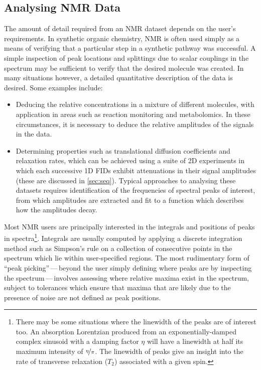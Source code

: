 \subsection{Analysing NMR Data}
\label{subsec:estimation-techniques}
The amount of detail required from an \ac{NMR} dataset depends on
the user's requirements. In synthetic organic chemistry, \ac{NMR} is often used
simply as a means of verifying that a particular step in a synthetic pathway
was successful. A simple inspection of peak locations and splittings due to
scalar couplings in the spectrum may be sufficient to verify that the desired
molecule was created. In many situations however, a detailed quantitative
description of the data is desired. Some examples include:
\begin{itemize}
    \item Deducing the relative concentrations in a mixture of different
        molecules, with application in areas such as reaction
        monitoring\cite{Bernstein2016} and metabolomics\cite{Emwas2019}.
        In these circumstances, it is necessary to deduce the relative
        amplitudes of the signals in the data.
    \item Determining properties such as translational diffusion coefficients
        and relaxation rates, which can be achieved using a suite of \ac{2D}
        experiments in which each successive \ac{1D} \acp{FID} exhibit
        attenuations in their signal amplitudes (these are discussed in
        \cref{sec:seq}).  Typical approaches to analysing these datasets
        requires identification of the frequencies of spectral peaks of
        interest, from which amplitudes are extracted and fit to a
        function which describes how the amplitudes decay.
\end{itemize}

Most \ac{NMR} users are principally interested in the integrals and positions
of peaks in spectra\footnote{
    There may be some situations where the linewidth of the peaks are of
    interest too. An absorption Lorentzian produced from an
    exponentially-damped complex sinusoid with a damping factor $\eta$ will
    have a linewidth at half its maximum intensity of $\nicefrac{\eta}{\pi}$.
    The linewidth of peaks give an insight into the rate of transverse
    relaxation ($T_2$) associated with a given spin.
}.
Integrals are usually computed by applying a discrete integration method such
as Simpson's rule on a collection of consecutive points in the spectrum which
lie within user-specified regions.
The most rudimentary form of ``peak picking''\,---\,beyond the user
simply defining where peaks are by inspecting the spectrum\,---\,involves
assessing where relative maxima exist in the spectrum, subject to
tolerances which ensure that maxima that are likely due to the presence of
noise are not defined as peak positions.

